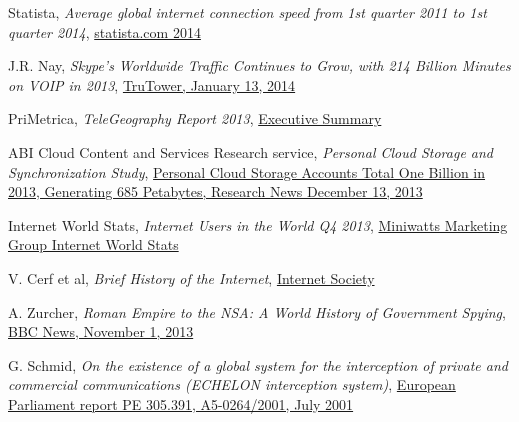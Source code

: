 \documentclass[twocolumn,english]{article}
\begin{document}
\begin{thebibliography}{9}

 Statista, \emph{Average global internet connection speed from 1st quarter 2011 to 1st quarter 2014}, \href{http://www.statista.com/statistics/204954/average-internet-connection-speed-worldwide/}{statista.com 2014}

 J.R. Nay, \emph{Skype's Worldwide Traffic Continues to Grow, with 214 Billion Minutes on VOIP in 2013}, \href{http://www.trutower.com/2014/01/13/skype-voip-app-calling-statistics-telegeography/}{TruTower, January 13, 2014}

 PriMetrica, \emph{TeleGeography Report 2013}, \href{http://www.telegeography.com/page_attachments/products/website/research-services/telegeography-report-database/0004/6341/TG_executive_summary.pdf}{Executive Summary}


 ABI Cloud Content and Services Research service, \emph{Personal Cloud Storage and Synchronization Study}, \href{https://www.abiresearch.com/press/personal-cloud-storage-accounts-total-one-billion-}{Personal Cloud Storage Accounts Total One Billion in 2013, Generating 685 Petabytes, Research News December 13, 2013}

 Internet World Stats, \emph{Internet Users in the World Q4 2013}, \href{http://www.internetworldstats.com/stats.htm}{Miniwatts Marketing Group Internet World Stats}

 V. Cerf et al, \emph{Brief History of the Internet}, \href{http://www.internetsociety.org/internet/what-internet/history-internet/brief-history-internet}{Internet Society}

 A. Zurcher, \emph{Roman Empire to the NSA: A World History of Government Spying}, \href{http://www.bbc.co.uk/news/magazine-24749166}{BBC News, November 1, 2013}

 G. Schmid, \emph{On the existence of a global system for the interception of private and commercial communications (ECHELON interception system)}, \href{http://www.europarl.europa.eu/sides/getDoc.do?pubRef=-//EP//TEXT+REPORT+A5-2001-0264+0+DOC+XML+V0//EN}{European Parliament report PE 305.391, A5-0264/2001, July 2001}


\end{thebibliography}
\end{document}
